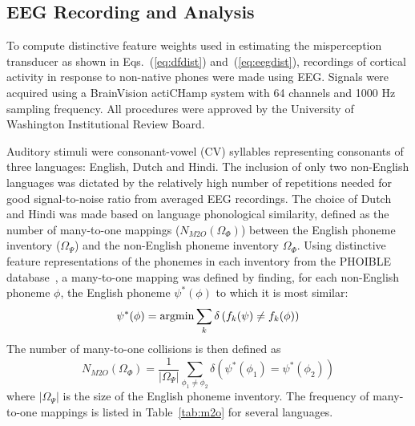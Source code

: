 \subsection{EEG Recording and Analysis}
\label{sec:methods_eeg}

To compute distinctive feature weights used in estimating the misperception
transducer as shown in Eqs.~(\ref{eq:dfdist}) and~(\ref{eq:eegdist}),
recordings of cortical activity in response to non-native phones were
made using EEG. Signals were acquired using a BrainVision actiCHamp 
system with 64 channels and 1000 Hz sampling frequency.
All procedures were approved by the University of Washington Institutional
Review Board.

Auditory stimuli were consonant-vowel
(CV) syllables representing consonants of three languages: English,
Dutch and Hindi. The inclusion of only two non-English languages 
was dictated by the relatively high number of
repetitions needed for good signal-to-noise ratio from averaged
EEG recordings. The choice of Dutch and Hindi was made based on language
phonological similarity, defined as the number of many-to-one mappings
($N_{M2O}(\Omega_\Phi)$) between the English phoneme inventory
($\Omega_\Psi$) and the non-English phoneme inventory $\Omega_\Phi$.
Using distinctive feature representations of the phonemes in each
inventory from the PHOIBLE database~\cite{phoible}, a many-to-one 
mapping was defined by finding, for each
non-English phoneme $\phi$, the English phoneme $\psi^*(\phi)$ to which
it is most similar:
\begin{equation}
  \psi^*(\phi) = \operatorname*{argmin} \sum_k \delta\left(f_k(\psi)\ne f_k(\phi)\right)
\end{equation}
The number of many-to-one collisions is then defined as
\begin{equation}
  N_{M2O}(\Omega_\Phi)=\frac{1}{|\Omega_\Psi|}\sum_{\phi_1\ne\phi_2}
  \delta\left(\psi^*(\phi_1)=\psi^*(\phi_2)\right)
\label{eq:m2o}
\end{equation}
where $|\Omega_\Psi|$ is the size of the English phoneme inventory.
The frequency of many-to-one mappings is listed in
Table~\ref{tab:m2o} for several languages.

